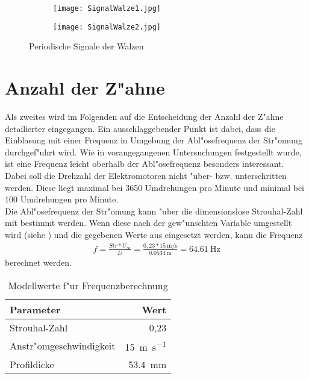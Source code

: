\begin{figure}[h]
	\centering
	\begin{subfigure}[c]{0.5\textwidth}		
		\texttt{[image: SignalWalze1.jpg]}
	\end{subfigure}
	\begin{subfigure}[c]{0.5\textwidth}
		\texttt{[image: SignalWalze2.jpg]}
	\end{subfigure}
	\caption{Periodische Signale der Walzen}
	\label{fig:signal}
\end{figure}


\newpage
\section{Anzahl der Z"ahne}
Als zweites wird im Folgenden auf die Entscheidung der Anzahl der Z"ahne detailierter eingegangen. Ein ausschlaggebender Punkt ist dabei, dass die Einblasung mit einer Frequenz in Umgebung der Abl"osefrequenz der Str"omung durchgef"uhrt wird. Wie in vorangegangenen Untersuchungen \cite{Oswald.2017} festgestellt wurde, ist eine Frequenz leicht oberhalb der Abl"osefrequenz besonders interessant. Dabei soll die Drehzahl der Elektromotoren nicht "uber- bzw. unterschritten werden. Diese liegt maximal bei 3650 Umdrehungen pro Minute und minimal bei 100 Umdrehungen pro Minute.\\
Die Abl"osefrequenz der Str"omung kann "uber die dimensionslose Strouhal-Zahl mit  bestimmt werden. Wenn diese nach der gew"unschten Variable umgestellt wird (siehe ) und die gegebenen Werte aus  eingesetzt werden, kann die Frequenz
\begin{align}
	{f}=\frac{Str*U_{\infty}}{D}
		=\frac{0,23*\SI{15}{\meter\per\second}}{\SI{0,0534}{\meter}}
		=\SI{64,61}{\hertz}
		\label{eq:nachfumgestellt}
\end{align}
berechnet werden.
\begin{table}[h!]
	\centering
	\begin{tabular}{lr}
		\toprule
		Parameter & Wert\\
		\midrule
		Strouhal-Zahl & 0,23\\
		Anstr"omgeschwindigkeit & \SI{15}{\meter\per\second}\\
		Profildicke & \SI{53,4}{\milli\meter}\\
		\bottomrule
	\end{tabular}
	\caption{Modellwerte f"ur Frequenzberechnung}
	\label{tab:Modellwerte}
\end{table}\\
